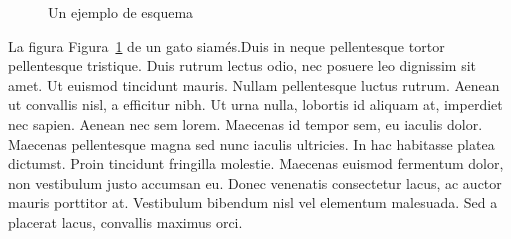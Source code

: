\documentclass[
  12pt,
  letterpaper,
  DIV=11,
  numbers=noendperiod,
  oneside]{scrreport}
\begin{document}
\begin{figure}


\caption{\label{fig-gatosiames}Un ejemplo de esquema}

\end{figure}%

La figura Figura~\ref{fig-gatosiames} de un gato siamés.Duis in neque
pellentesque tortor pellentesque tristique. Duis rutrum lectus odio, nec
posuere leo dignissim sit amet. Ut euismod tincidunt mauris. Nullam
pellentesque luctus rutrum. Aenean ut convallis nisl, a efficitur nibh.
Ut urna nulla, lobortis id aliquam at, imperdiet nec sapien. Aenean nec
sem lorem. Maecenas id tempor sem, eu iaculis dolor. Maecenas
pellentesque magna sed nunc iaculis ultricies. In hac habitasse platea
dictumst. Proin tincidunt fringilla molestie. Maecenas euismod fermentum
dolor, non vestibulum justo accumsan eu. Donec venenatis consectetur
lacus, ac auctor mauris porttitor at. Vestibulum bibendum nisl vel
elementum malesuada. Sed a placerat lacus, convallis maximus orci.
\end{document}
